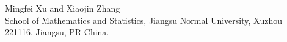 \documentclass[a4paper]{amsart}
\theoremstyle{definition}
\theoremstyle{remark}
\numberwithin{equation}{section}
\begin{document}
\vskip 10pt

{\footnotesize \noindent Mingfei Xu and Xiaojin Zhang\\
School of Mathematics and Statistics, Jiangsu Normal University, Xuzhou 221116, Jiangsu, PR China.\\}


\end{document}
